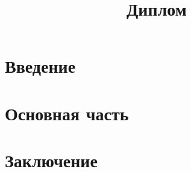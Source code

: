 \documentclass[12pt]{article}
\title{Диплом}
\begin{document}
\maketitle

\section{Введение}

\section{Основная часть}

\section{Заключение}
\end{document}
